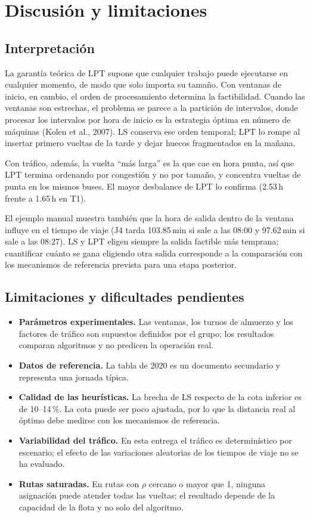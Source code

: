 \section{Discusión y limitaciones}\label{sec:discusion}

\subsection{Interpretación}
La garantía teórica de LPT supone que cualquier trabajo puede ejecutarse en cualquier momento, de modo que solo importa su tamaño. Con ventanas de inicio, en cambio, el orden de procesamiento determina la factibilidad. Cuando las ventanas son estrechas, el problema se parece a la partición de intervalos, donde procesar los intervalos por hora de inicio es la estrategia óptima en número de máquinas (Kolen et al., 2007). LS conserva ese orden temporal; LPT lo rompe al insertar primero vueltas de la tarde y dejar huecos fragmentados en la mañana.

Con tráfico, además, la vuelta ``más larga'' es la que cae en hora punta, así que LPT termina ordenando por congestión y no por tamaño, y concentra vueltas de punta en los mismos buses. El mayor desbalance de LPT lo confirma (2.53\,h frente a 1.65\,h en T1).

El ejemplo manual muestra también que la hora de salida dentro de la ventana influye en el tiempo de viaje (J4 tarda 103.85\,min si sale a las 08:00 y 97.62\,min si sale a las 08:27). LS y LPT eligen siempre la salida factible más temprana; cuantificar cuánto se gana eligiendo otra salida corresponde a la comparación con los mecanismos de referencia prevista para una etapa posterior.

\subsection{Limitaciones y dificultades pendientes}
\begin{itemize}
  \item \textbf{Parámetros experimentales.} Las ventanas, los turnos de almuerzo y los factores de tráfico son supuestos definidos por el grupo; los resultados comparan algoritmos y no predicen la operación real.
  \item \textbf{Datos de referencia.} La tabla de 2020 es un documento secundario y representa una jornada típica.
  \item \textbf{Calidad de las heurísticas.} La brecha de LS respecto de la cota inferior es de 10--14\,\%. La cota puede ser poco ajustada, por lo que la distancia real al óptimo debe medirse con los mecanismos de referencia.
  \item \textbf{Variabilidad del tráfico.} En esta entrega el tráfico es determinístico por escenario; el efecto de las variaciones aleatorias de los tiempos de viaje no se ha evaluado.
  \item \textbf{Rutas saturadas.} En rutas con $\rho$ cercano o mayor que 1, ninguna asignación puede atender todas las vueltas; el resultado depende de la capacidad de la flota y no solo del algoritmo.
\end{itemize}

